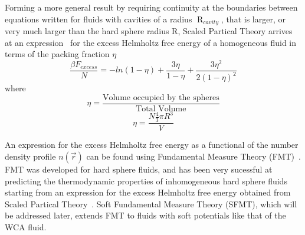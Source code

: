\documentclass[double,12pt]{beavtex}
\begin{document}
Forming a more general result by requiring 
continuity at the boundaries between equations written for fluids with 
cavities of a radius $\operatorname{R}_{cavity}$, that is larger, or very 
much larger than the hard sphere radius R, Scaled Partical Theory arrives at an 
expression~\cite{Hansen} for the excess Helmholtz 
free energy of a homogeneous fluid in terms of the packing fraction $\eta$ 
\begin{equation}\label{Fexcess-SPT}{\frac{\beta{F_{excess}}}{N}=-ln(1-\eta)+\frac{3\eta}{1-\eta}+\frac{3{\eta}^2}{2(1-\eta)^2}}\end{equation} 
where
\begin{equation}{\eta = \frac{\mbox{Volume occupied by the spheres}}{\mbox{Total Volume}}}\end{equation}
\begin{equation}{\eta = \frac{N\frac{4}{3}\pi{R^3}}{V}}\end{equation}

An expression for the excess Helmholtz free energy as a functional of the 
number density profile $n(\vec r)$ can be found using Fundamental Measure 
Theory (FMT)~\cite{rosenfeld1989}. FMT was developed for hard sphere fluids, and has been very 
sucessful at predicting the thermodynamic properties of inhomogeneous hard 
sphere fluids starting from an expression for the excess Helmholtz free 
energy obtained from Scaled Partical Theory~\cite{santos2012phi3}. 
Soft Fundamental Measure Theory (SFMT), which will be addressed later, 
extends FMT to fluids with soft potentials like that of the WCA fluid.
\end{document}
